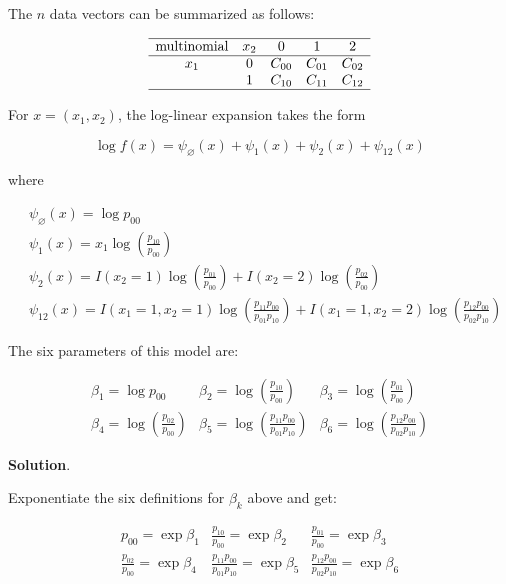 The \(n\) data vectors can be summarized as follows:

\[
\begin{array}{ccccc}
\hline
\text{multinomial} & x_{2} & 0 & 1 & 2 \\
\hline
x_{1} & 0 & C_{00} & C_{01} & C_{02} \\
    & 1 & C_{10} & C_{11} & C_{12} \\
\hline
\end{array}
\]

For \(x = (x_{1}, x_{2})\), the log-linear expansion takes the form

\[
\log f(x) = \psi_\varnothing(x) + \psi_{1}(x) + \psi_{2}(x) + \psi_{12}(x)
\]

where

\begin{align*}
& \psi_\varnothing(x) = \log p_{00} \\
& \psi_{1}(x) = x_{1} \log \left( \frac{p_{10}}{p_{00}} \right) \\
& \psi_{2}(x) = I(x_{2} = 1) \log \left( \frac{p_{01}}{p_{00}} \right) 
            + I(x_{2} = 2) \log \left( \frac{p_{02}}{p_{00}} \right) \\
& \psi_{12}(x) = I(x_{1} = 1, x_{2} = 1) \log \left( \frac{p_{11}p_{00}}{p_{01}p_{10}} \right)
               + I(x_{1} = 1, x_{2} = 2) \log \left( \frac{p_{12}p_{00}}{p_{02}p_{10}} \right)
\end{align*}

The six parameters of this model are:

\[
\begin{array}{ccc}
\beta_{1} = \log p_{00} &
\beta_{2} = \log \left( \frac{p_{10}}{p_{00}} \right) &
\beta_{3} = \log \left( \frac{p_{01}}{p_{00}} \right) \\
\beta_{4} = \log \left( \frac{p_{02}}{p_{00}} \right) &
\beta_{5} = \log \left( \frac{p_{11}p_{00}}{p_{01}p_{10}} \right) &
\beta_{6} = \log \left( \frac{p_{12}p_{00}}{p_{02}p_{10}} \right)
\end{array}
\]

\textbf{Solution}.

Exponentiate the six definitions for \(\beta_{k}\) above and get:

\[
\begin{array}{ccc}
p_{00} = \exp \beta_{1} &
\frac{p_{10}}{p_{00}} = \exp \beta_{2} &
\frac{p_{01}}{p_{00}} = \exp \beta_{3} \\
\frac{p_{02}}{p_{00}} = \exp \beta_{4} &
\frac{p_{11}p_{00}}{p_{01}p_{10}} = \exp \beta_{5} &
\frac{p_{12}p_{00}}{p_{02}p_{10}} = \exp \beta_{6}
\end{array}
\]

